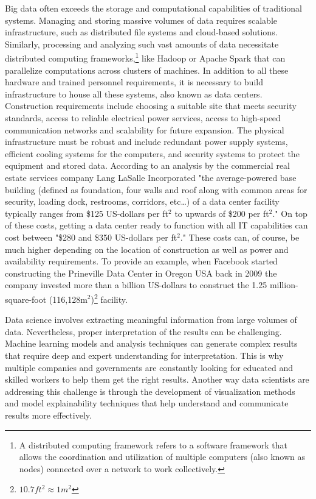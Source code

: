 \documentclass{vgtc}                          %
\begin{document}
Big data often exceeds the storage and computational capabilities of traditional systems. Managing and storing massive volumes of data requires scalable infrastructure, 
such as distributed file systems and cloud-based solutions. Similarly, processing and analyzing such vast amounts of data necessitate distributed computing 
frameworks,\footnote{A distributed computing framework refers to a software framework that allows the coordination and utilization of multiple computers (also known 
as nodes) connected over a network to work collectively.} like Hadoop or Apache Spark that can parallelize computations across clusters of machines. In addition to all these 
hardware and trained personnel requirements, it is necessary to build infrastructure to house all these systems, also known as data centers. Construction requirements include 
choosing a suitable site that meets security standards, access to reliable electrical power services, access to high-speed communication networks and scalability for future expansion. 
The physical infrastructure must be robust and include redundant power supply systems, efficient cooling systems for the computers, and 
security systems to protect the equipment and stored data. According to an analysis by the commercial real estate services company Lang LaSalle Incorporated "the 
average-powered base building (defined as foundation, four walls and roof along with common areas for security, loading dock, restrooms, corridors, etc…) of a 
data center facility typically ranges from \$125 US-dollars per ft$^2$ to upwards of \$200 per ft$^2$."\cite{Hawkins:2022} On top of these costs, getting a data center ready to function 
with all IT capabilities can cost between "\$280 and \$350 US-dollars per ft$^2$."\cite{Hawkins:2022} These costs can, of course, be much higher depending on the location 
of construction as well as power and availability requirements. To provide an example, when Facebook started constructing the Prineville Data Center in Oregon USA back in 2009 the 
company invested more than a billion US-dollars to construct the 1.25 million-square-foot (116,128m$^2$)\footnote{$10.7ft^2 \approx 1m^2$} facility.\newline

Data science involves extracting meaningful information from large volumes of data. Nevertheless, proper interpretation of the results can be challenging. Machine learning 
models and analysis techniques can generate complex results that require deep and expert understanding for interpretation. This is why multiple companies and governments are 
constantly looking for educated and skilled workers to help them get the right results. Another way data scientists are addressing this challenge is through the development of 
visualization methods and model explainability techniques that help understand and communicate results more effectively.
\end{document}
